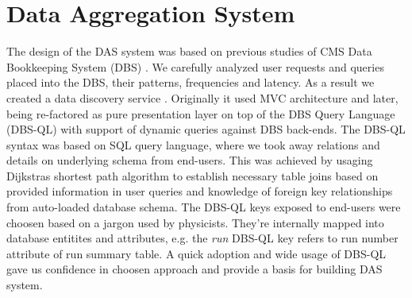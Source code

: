 \documentclass[a4paper]{jpconf}
\begin{document}
\section{Data Aggregation System\label{DAS}}
The design of the DAS system was based on previous studies of CMS Data 
Bookkeeping System (DBS) \cite{DBS, DBS07}. We carefully analyzed user
requests and queries placed into the DBS, their patterns, frequencies and latency. 
As a result we created a data discovery service \cite{DD}. Originally it used MVC
architecture and later, being re-factored as pure presentation layer on top of 
the DBS Query Language (DBS-QL) \cite{DBS-QL} with support of dynamic queries against
DBS back-ends. The DBS-QL \cite{DBS-QL} syntax was based on SQL query language, where 
we took away relations and details on underlying schema from end-users. 
This was achieved by usaging Dijkstras shortest path algorithm 
to establish necessary table joins based on provided information in user queries and
knowledge of foreign key relationships from auto-loaded database schema.
The DBS-QL keys exposed to end-users were choosen based on a jargon used by
physicists. They're internally mapped into database entitites and attributes, 
e.g. the {\it run} DBS-QL key refers to run number attribute of run summary table.
A quick adoption and wide usage of DBS-QL gave us confidence in choosen approach 
and provide a basis for building DAS system.
\end{document}
